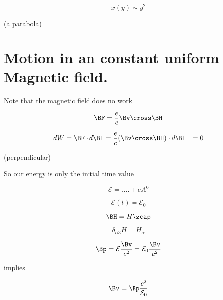 \begin{equation}\label{eqn:relativisticElectrodynamicsT3:480}
x(y) \sim y^2
\end{equation}

(a parabola)

\section{Motion in an constant uniform Magnetic field.}

Note that the magnetic field does no work

\begin{equation}\label{eqn:relativisticElectrodynamicsT3:500}
\BF = \frac{e}{c} \Bv \cross \BH
\end{equation}

\begin{align*}
dW = 
\BF \cdot d\Bl
&=
\frac{e}{c} (\Bv \cross \BH) \cdot d\Bl
&= 0
\end{align*}

(perpendicular)

So our energy is only the initial time value

\begin{equation}\label{eqn:relativisticElectrodynamicsT3:520}
\mathcal{E} = .... + e A^0
\end{equation}

\begin{equation}\label{eqn:relativisticElectrodynamicsT3:540}
\mathcal{E}(t) = \mathcal{E}_0
\end{equation}

\begin{equation}\label{eqn:relativisticElectrodynamicsT3:560}
\BH = H \zcap
\end{equation}

\begin{equation}\label{eqn:relativisticElectrodynamicsT3:580}
\delta_{\alpha 3} H = H_\alpha
\end{equation}

\begin{equation}\label{eqn:relativisticElectrodynamicsT3:600}
\Bp = \mathcal{E} \frac{\Bv}{c^2} = \mathcal{E}_0 \frac{\Bv}{c^2}
\end{equation}

implies

\begin{equation}\label{eqn:relativisticElectrodynamicsT3:620}
\Bv = \Bp \frac{c^2}{\mathcal{E}_0}
\end{equation}


